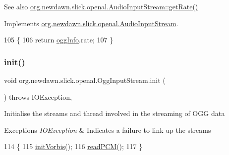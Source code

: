 \begin{DoxySeeAlso}{See also}
\mbox{\hyperlink{interfaceorg_1_1newdawn_1_1slick_1_1openal_1_1_audio_input_stream_a461c4ad4304ff8d75693c93e525e0f85}{org.\+newdawn.\+slick.\+openal.\+Audio\+Input\+Stream\+::get\+Rate()}} 
\end{DoxySeeAlso}


Implements \mbox{\hyperlink{interfaceorg_1_1newdawn_1_1slick_1_1openal_1_1_audio_input_stream_a461c4ad4304ff8d75693c93e525e0f85}{org.\+newdawn.\+slick.\+openal.\+Audio\+Input\+Stream}}.


\begin{DoxyCode}
105                          \{
106         \textcolor{keywordflow}{return} \mbox{\hyperlink{classorg_1_1newdawn_1_1slick_1_1openal_1_1_ogg_input_stream_a21aa37c5c0611a79132c4d76fbefe460}{oggInfo}}.rate;
107     \}
\end{DoxyCode}
\mbox{\label{classorg_1_1newdawn_1_1slick_1_1openal_1_1_ogg_input_stream_a176448e8fa99bed81b3a3e104b2492e4}} 
\subsubsection{\texorpdfstring{init()}{init()}}
{\footnotesize\ttfamily void org.\+newdawn.\+slick.\+openal.\+Ogg\+Input\+Stream.\+init (\begin{DoxyParamCaption}{ }\end{DoxyParamCaption}) throws I\+O\+Exception\hspace{0.3cm}{\ttfamily [inline]}, {\ttfamily [private]}}

Initialise the streams and thread involved in the streaming of O\+GG data


\begin{DoxyExceptions}{Exceptions}
{\em I\+O\+Exception} & Indicates a failure to link up the streams \\
\hline
\end{DoxyExceptions}

\begin{DoxyCode}
114                                            \{
115         \mbox{\hyperlink{classorg_1_1newdawn_1_1slick_1_1openal_1_1_ogg_input_stream_adb26594ad230cd2e6eb05d549859fbbb}{initVorbis}}();
116         \mbox{\hyperlink{classorg_1_1newdawn_1_1slick_1_1openal_1_1_ogg_input_stream_ac65475d928528fa2e69dee80131f29a8}{readPCM}}();
117     \}
\end{DoxyCode}
\mbox{\label{classorg_1_1newdawn_1_1slick_1_1openal_1_1_ogg_input_stream_adb26594ad230cd2e6eb05d549859fbbb}} 
